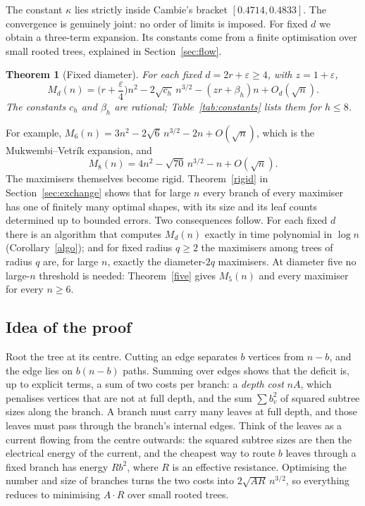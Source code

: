 \documentclass[11pt,a4paper]{article}
\newtheorem{theorem}{Theorem}[section]
\theoremstyle{remark}
\newcommand{\eps}{\varepsilon}
\begin{document}
The constant $\kappa$ lies strictly inside Cambie's bracket $[0.4714,0.4833]$. The convergence is genuinely joint: no order of limits is imposed. For fixed $d$ we obtain a three-term expansion. Its constants come from a finite optimisation over small rooted trees, explained in Section~\ref{sec:flow}.

\begin{theorem}[Fixed diameter]\label{main}
For each fixed $d=2r+\eps\ge4$, with $z=1+\eps$,
\[
 M_d(n)=\Big(r+\frac\eps4\Big)n^2-2\sqrt{c_h}\,n^{3/2}-(zr+\beta_h)n+O_d(\sqrt n).
\]
The constants $c_h$ and $\beta_h$ are rational; Table~\ref{tab:constants} lists them for $h\le8$.
\end{theorem}

For example, $M_6(n)=3n^2-2\sqrt6\,n^{3/2}-2n+O(\sqrt n)$, which is the Mukwembi--Vetrík expansion, and
\[
 M_8(n)=4n^2-\sqrt{70}\,n^{3/2}-n+O(\sqrt n).
\]
The maximisers themselves become rigid. Theorem~\ref{rigid} in Section~\ref{sec:exchange} shows that for large $n$ every branch of every maximiser has one of finitely many optimal shapes, with its size and its leaf counts determined up to bounded errors. Two consequences follow. For each fixed $d$ there is an algorithm that computes $M_d(n)$ exactly in time polynomial in $\log n$ (Corollary~\ref{algo}); and for fixed radius $q\ge2$ the maximisers among trees of radius $q$ are, for large $n$, exactly the diameter-$2q$ maximisers. At diameter five no large-$n$ threshold is needed: Theorem~\ref{five} gives $M_5(n)$ and every maximiser for every $n\ge6$.

\subsection{Idea of the proof}
Root the tree at its centre. Cutting an edge separates $b$ vertices from $n-b$, and the edge lies on $b(n-b)$ paths. Summing over edges shows that the deficit is, up to explicit terms, a sum of two costs per branch: a \emph{depth cost} $nA$, which penalises vertices that are not at full depth, and the sum $\sum b_v^2$ of squared subtree sizes along the branch. A branch must carry many leaves at full depth, and those leaves must pass through the branch's internal edges. Think of the leaves as a current flowing from the centre outwards: the squared subtree sizes are then the electrical energy of the current, and the cheapest way to route $b$ leaves through a fixed branch has energy $Rb^2$, where $R$ is an effective resistance. Optimising the number and size of branches turns the two costs into $2\sqrt{AR}\,n^{3/2}$, so everything reduces to minimising $A\cdot R$ over small rooted trees.
\end{document}
